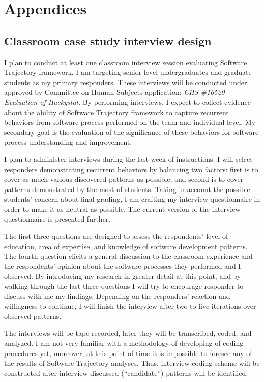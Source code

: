 \chapter{Appendices} \label{appendix}

\section{Classroom case study interview design} \label{survey}
I plan to conduct at least one classroom interview session evaluating Software Trajectory framework. I am targeting senior-level undergraduates and graduate students as my primary responders. These interviews will be conducted under approved by Committee on Human Subjects application: \textit{CHS \#16520 - Evaluation of Hackystat}. By performing interviews, I expect to collect evidence about the ability of Software Trajectory framework to capture recurrent behaviors from software process performed on the team and individual level. My secondary goal is the evaluation of the significance of these behaviors for software process understanding and improvement. 

I plan to administer interviews during the last week of instructions. I will select responders demonstrating recurrent behaviors by balancing two factors: first is to cover as much various discovered patterns as possible, and second is to cover patterns demonstrated by the most of students. Taking in account the possible students' concern about final grading, I am crafting my interview questionnaire in order to make it as neutral as possible. The current version of the interview questionnaire is presented further. 

The first three questions are designed to assess the respondents' level of education, area of expertise, and knowledge of software development patterns. The fourth question elicits a general discussion to the classroom experience and the respondents' opinion about the software processes they performed and I observed. By introducing my research in greater detail at this point, and by walking through the last three questions I will try to encourage responder to discuss with me my findings. Depending on the responders' reaction and willingness to continue, I will finish the interview after two to five iterations over observed patterns.

The interviews will be tape-recorded, later they will be transcribed, coded, and analyzed. I am not very familiar with a methodology of developing of coding procedures yet, moreover, at this point of time it is impossible to foresee any of the results of Software Trajectory analyses. Thus, interview coding scheme will be constructed after interview-discussed (``candidate'') patterns will be identified.

